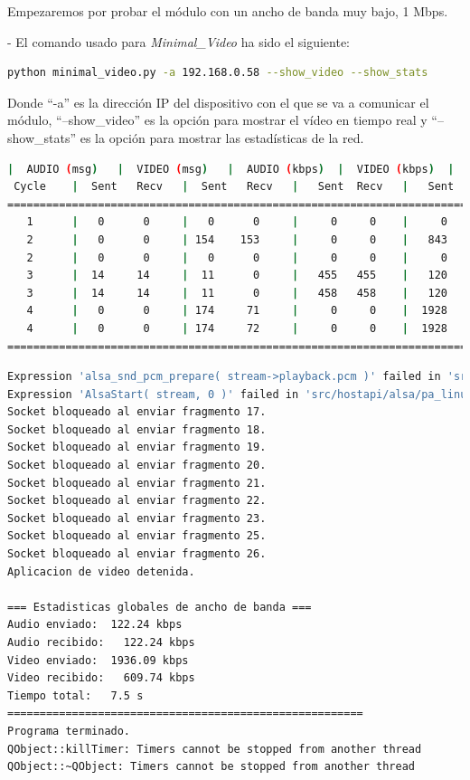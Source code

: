 Empezaremos por probar el módulo con un ancho de banda muy bajo, 1 Mbps. 

- El comando usado para \textit{Minimal\_Video} ha sido el siguiente:
\vspace{\baselineskip}

\begin{lstlisting}[language=bash]
python minimal_video.py -a 192.168.0.58 --show_video --show_stats
\end{lstlisting}
Donde ``-a'' es la dirección IP del dispositivo con el que se va a comunicar el módulo, ``--show\_video'' es la opción para mostrar el vídeo en tiempo real y ``--show\_stats'' es la opción para mostrar las estadísticas de la red.
\vspace{\baselineskip}

\begin{lstlisting}[language=bash,basicstyle=\ttfamily\scriptsize]
          |  AUDIO (msg)   |  VIDEO (msg)   |  AUDIO (kbps)  |  VIDEO (kbps)  |   CPU (%)
 Cycle    |  Sent   Recv   |  Sent   Recv   |   Sent  Recv   |   Sent  Recv   | Program System
============================================================================================
   1      |   0      0     |   0      0     |     0     0    |     0     0    |   0      0
   2      |   0      0     | 154    153     |     0     0    |   843   837    |  63      0
   2      |   0      0     |   0      0     |     0     0    |     0     0    |   0      4
   3      |  14     14     |  11      0     |   455   455    |   120     0    |   0     85
   3      |  14     14     |  11      0     |   458   458    |   120     0    |   0     85
   4      |   0      0     | 174     71     |     0     0    |  1928   787    |   0     57
   4      |   0      0     | 174     72     |     0     0    |  1928   798    |   0     57
============================================================================================
\end{lstlisting}


\begin{lstlisting}[language=bash,basicstyle=\ttfamily\scriptsize]
Expression 'alsa_snd_pcm_prepare( stream->playback.pcm )' failed in 'src/hostapi/alsa/pa_linux_alsa.c', line: 2920
Expression 'AlsaStart( stream, 0 )' failed in 'src/hostapi/alsa/pa_linux_alsa.c', line: 3246
Socket bloqueado al enviar fragmento 17.
Socket bloqueado al enviar fragmento 18.
Socket bloqueado al enviar fragmento 19.
Socket bloqueado al enviar fragmento 20.
Socket bloqueado al enviar fragmento 21.
Socket bloqueado al enviar fragmento 22.
Socket bloqueado al enviar fragmento 23.
Socket bloqueado al enviar fragmento 25.
Socket bloqueado al enviar fragmento 26.
Aplicacion de video detenida.

=== Estadisticas globales de ancho de banda ===
Audio enviado:	122.24 kbps
Audio recibido:   122.24 kbps
Video enviado:	1936.09 kbps
Video recibido:   609.74 kbps
Tiempo total: 	7.5 s
=======================================================
Programa terminado.
QObject::killTimer: Timers cannot be stopped from another thread
QObject::~QObject: Timers cannot be stopped from another thread
\end{lstlisting}

